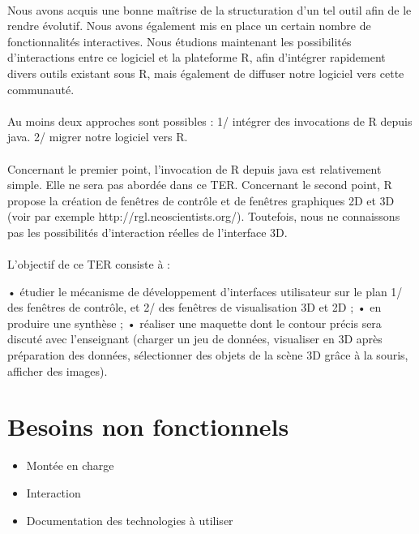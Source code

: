 \documentclass{article}
\begin{document}
\paragraph{}
Nous avons acquis une bonne maîtrise de la structuration d'un tel outil afin de le rendre évolutif.
Nous avons également mis en place un certain nombre de fonctionnalités interactives.
Nous étudions maintenant les possibilités d'interactions entre ce logiciel et la plateforme R, afin
d'intégrer rapidement divers outils existant sous R, mais également de diffuser notre logiciel vers
cette communauté.
\paragraph{}
Au moins deux approches sont possibles : 1/ intégrer des invocations de R depuis java. 2/ migrer
notre logiciel vers R.
\paragraph{}
Concernant le premier point, l'invocation de R depuis java est relativement simple. Elle ne sera pas
abordée dans ce TER. Concernant le second point, R propose la création de fenêtres de contrôle et
de fenêtres graphiques 2D et 3D (voir par exemple http://rgl.neoscientists.org/). Toutefois, nous ne
connaissons pas les possibilités d'interaction réelles de l'interface 3D.
\paragraph{}
L'objectif de ce TER consiste à :

• étudier le mécanisme de développement d'interfaces utilisateur sur le plan 1/ des fenêtres de
contrôle, et 2/ des fenêtres de visualisation 3D et 2D ;
• en produire une synthèse ;
• réaliser une maquette dont le contour précis sera discuté avec l'enseignant (charger un jeu de
données, visualiser en 3D après préparation des données, sélectionner des objets de la scène
3D grâce à la souris, afficher des images).

\newpage
\section{Besoins non fonctionnels}
\begin{itemize}
\item Montée en charge
\item Interaction
\item Documentation des technologies à utiliser
\end{itemize}
\end{document}
